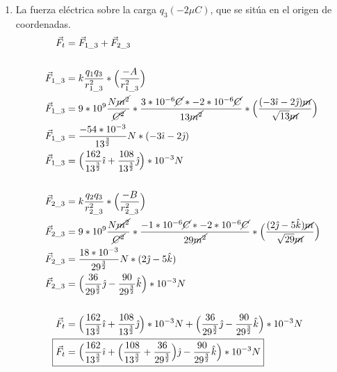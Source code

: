 \documentclass[12pt, twoside]{article}
\begin{document}
\begin{enumerate}
\begin{enumerate}
			\item La fuerza eléctrica sobre la carga $q_3(-2\mu C)$,
				que se sitúa en el origen de coordenadas.
				\begin{align*}
					\vec{F}_t &= \vec{F}_{1\_3}+\vec{F}_{2\_3}\\
					\\
					\vec{F}_{1\_3} &= k \frac{q_1q_3}{r^2_{1\_3}}*
					\Big{(} \frac{-A}{r^2_{1\_3}} \Big{)}\\
					\vec{F}_{1\_3} &= 9*10^9 \frac{N\cancel{m^2}}{\cancel{C^2}}*
					\frac{3*10^{-6}\cancel{C}*-2*10^{-6}\cancel{C}}{13\cancel{m^2}}*
					\Big{(} \frac{(-3\hat{\imath}-2\hat{\jmath})\cancel{m}}{\sqrt{13}\cancel{m}} \Big{)}\\
					\vec{F}_{1\_3} &= \frac{-54*10^{-3}}{13^{ \frac{3}{2} }}N*
					(-3\hat{\imath}-2\hat{\jmath})\\
					\vec{F}_{1\_3} &= \Big{(}
					\frac{162}{13^{ \frac{3}{2} }} \hat{\imath}+
					\frac{108}{13^{ \frac{3}{2} }} \hat{\jmath}
					\Big{)}*10^{-3}N\\
					\\
					\vec{F}_{2\_3} &= k \frac{q_2q_3}{r^2_{2\_3}}*
					\Big{(} \frac{-B}{r^2_{2\_3}} \Big{)}\\
					\vec{F}_{2\_3} &= 9*10^9 \frac{N\cancel{m^2}}{\cancel{C^2}}*
					\frac{-1*10^{-6}\cancel{C}*-2*10^{-6}\cancel{C}}{29\cancel{m^2}}*
					\Big{(} \frac{(2\hat{\jmath}-5\hat{k})\cancel{m}}{\sqrt{29}\cancel{m}} \Big{)}\\
					\vec{F}_{2\_3} &= \frac{18*10^{-3}}{29^{ \frac{3}{2} }} N*
					(2\hat{\jmath}-5\hat{k})\\
					\vec{F}_{2\_3} &= \Big{(}
					\frac{36}{29^{ \frac{3}{2} }}\hat{\jmath} -
					\frac{90}{29^{ \frac{3}{2} }}\hat{k}
					\Big{)}*10^{-3}N\\
					\\
					\vec{F}_t &= \Big{(}
					\frac{162}{13^{ \frac{3}{2} }} \hat{\imath}+
					\frac{108}{13^{ \frac{3}{2} }} \hat{\jmath}
					\Big{)}*10^{-3}N+
					\Big{(}
					\frac{36}{29^{ \frac{3}{2} }}\hat{\jmath} -
					\frac{90}{29^{ \frac{3}{2} }}\hat{k}
					\Big{)}*10^{-3}N\\
					\Aboxed
					{
						\vec{F}_t &= \Big{(}
						\frac{162}{13^{ \frac{3}{2} }} \hat{\imath}+
						\Big{(}
						\frac{108}{13^{ \frac{3}{2} }}+
						\frac{36}{29^{ \frac{3}{2} }}
						\Big{)}\hat{\jmath}-
						\frac{90}{29^{ \frac{3}{2} }}\hat{k}
						\Big{)}*10^{-3}N
					}
				\end{align*}
		\end{enumerate}


\end{enumerate}
\end{document}
